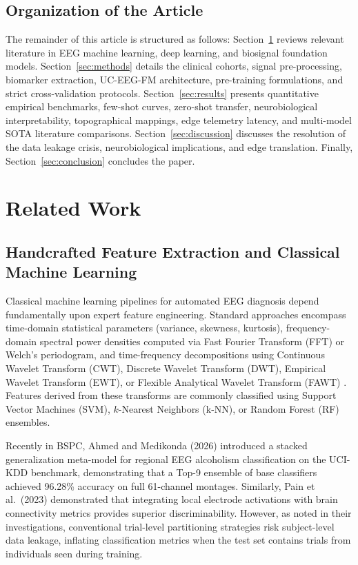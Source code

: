 \documentclass[11pt,a4paper]{article}
\begin{document}
\subsection{Organization of the Article}
The remainder of this article is structured as follows: Section~\ref{sec:related} reviews relevant literature in EEG machine learning, deep learning, and biosignal foundation models. Section~\ref{sec:methods} details the clinical cohorts, signal pre-processing, biomarker extraction, UC-EEG-FM architecture, pre-training formulations, and strict cross-validation protocols. Section~\ref{sec:results} presents quantitative empirical benchmarks, few-shot curves, zero-shot transfer, neurobiological interpretability, topographical mappings, edge telemetry latency, and multi-model SOTA literature comparisons. Section~\ref{sec:discussion} discusses the resolution of the data leakage crisis, neurobiological implications, and edge translation. Finally, Section~\ref{sec:conclusion} concludes the paper.

\section{Related Work}
\label{sec:related}

\subsection{Handcrafted Feature Extraction and Classical Machine Learning}
Classical machine learning pipelines for automated EEG diagnosis depend fundamentally upon expert feature engineering. Standard approaches encompass time-domain statistical parameters (variance, skewness, kurtosis), frequency-domain spectral power densities computed via Fast Fourier Transform (FFT) or Welch's periodogram, and time-frequency decompositions using Continuous Wavelet Transform (CWT), Discrete Wavelet Transform (DWT), Empirical Wavelet Transform (EWT), or Flexible Analytical Wavelet Transform (FAWT) \cite{anuragi2019bspc,anuragi2020bspc}. Features derived from these transforms are commonly classified using Support Vector Machines (SVM), $k$-Nearest Neighbors (k-NN), or Random Forest (RF) ensembles.

Recently in BSPC, Ahmed and Medikonda (2026) \cite{ahmed2026bspc} introduced a stacked generalization meta-model for regional EEG alcoholism classification on the UCI-KDD benchmark, demonstrating that a Top-9 ensemble of base classifiers achieved 96.28\% accuracy on full 61-channel montages. Similarly, Pain et al.\ (2023) \cite{pain2023bspc} demonstrated that integrating local electrode activations with brain connectivity metrics provides superior discriminability. However, as noted in their investigations, conventional trial-level partitioning strategies risk subject-level data leakage, inflating classification metrics when the test set contains trials from individuals seen during training.
\end{document}
